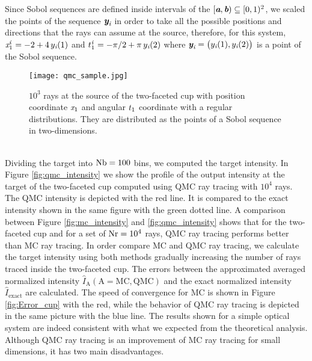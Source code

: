 Since Sobol sequences are defined inside intervals of the  $[\textit{\textbf{a}}, \textit{\textbf{b}})\subseteq[0,1)^2$, we scaled the points of the sequence $\textit{\textbf{y}}_{\textit{i}}$ in order to take all the possible positions and directions that the rays can assume at the source, therefore, for this system, $\textit{x}_1^{\textit{i}} = -2+4\,y_{\textit{i}}(1)$ and $t_1^{\textit{i}} = -\pi/2+\pi\,y_{\textit{i}}(2)$ where 
$\textit{\textbf{y}}_{\textit{i}} = \big(y_{\textit{i}}(1), y_{\textit{i}}(2)\big)$ is a point of the Sobol sequence. 
\begin{figure}[t]
\begin{center}
    \texttt{[image: qmc\_sample.jpg]}
    \caption{$10^3$ rays at the source of the two-faceted cup with position coordinate $\textit{x}_1$ and angular $t_1$ coordinate with a regular distributions.
They are distributed as the points of a Sobol sequence in two-dimensions.}
    \label{fig:qmc_sample1}
\end{center}
  \end{figure}
\\ \indent Dividing the target into $\textrm{Nb}=100$ bins, we computed the target intensity. 
In Figure \ref{fig:qmc_intensity} we show the profile of the output intensity at the target of the two-faceted cup computed using QMC ray tracing with $10^4$ rays. 
The QMC intensity is depicted with the red line. It is compared to the exact intensity shown in the same figure with the green dotted line.
A comparison between Figure \ref{fig:mc_intensity} and \ref{fig:qmc_intensity} shows that for the two-faceted cup and for a set of $\textrm{Nr}=10^4$ rays, QMC ray tracing performs better than MC ray tracing. In order compare MC and QMC ray tracing, we calculate the target intensity using both methods gradually increasing the number of rays traced inside the two-faceted cup. The errors between the approximated averaged normalized intensity $\hat{I}_{\textrm{A}} (\textrm{A} = \textrm{MC}, \textrm{QMC})$ and the exact normalized intensity $\hat{I}_\textrm{exact}$ are calculated.
The speed of convergence for MC is shown in Figure \ref{fig:Error_cup} with the red, while the behavior of QMC ray tracing is depicted in the same picture with the blue line.
The results shown for a simple optical system are indeed consistent with what we expected from the theoretical analysis.
\\\indent Although QMC ray tracing is an improvement of MC ray tracing for small dimensions, it has two main disadvantages. 
